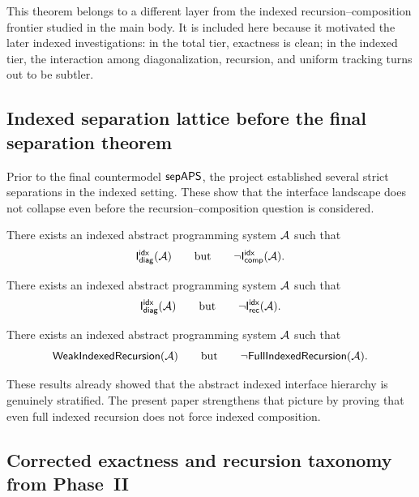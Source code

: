 \documentclass[11pt]{article}
\begin{document}
\begin{remark}
This theorem belongs to a different layer from the indexed recursion--composition frontier studied in the main body.  It is included here because it motivated the later indexed investigations: in the total tier, exactness is clean; in the indexed tier, the interaction among diagonalization, recursion, and uniform tracking turns out to be subtler.
\end{remark}

\subsection{Indexed separation lattice before the final separation theorem}\label{app:indexed-lattice}

Prior to the final countermodel \(\mathsf{sepAPS}\), the project established several strict separations in the indexed setting.  These show that the interface landscape does not collapse even before the recursion--composition question is considered.

\begin{theorem}\label{thm:app-diag-not-comp}
There exists an indexed abstract programming system \(\mathcal{A}\) such that
\[
\mathsf{I}_{\mathsf{diag}}^{\mathsf{idx}}(\mathcal{A})
\qquad\text{but}\qquad
\neg \mathsf{I}_{\mathsf{comp}}^{\mathsf{idx}}(\mathcal{A}).
\]
\end{theorem}

\begin{theorem}\label{thm:app-diag-not-rec}
There exists an indexed abstract programming system \(\mathcal{A}\) such that
\[
\mathsf{I}_{\mathsf{diag}}^{\mathsf{idx}}(\mathcal{A})
\qquad\text{but}\qquad
\neg \mathsf{I}_{\mathsf{rec}}^{\mathsf{idx}}(\mathcal{A}).
\]
\end{theorem}

\begin{theorem}\label{thm:app-weak-not-full}
There exists an indexed abstract programming system \(\mathcal{A}\) such that
\[
\mathsf{WeakIndexedRecursion}(\mathcal{A})
\qquad\text{but}\qquad
\neg \mathsf{FullIndexedRecursion}(\mathcal{A}).
\]
\end{theorem}

These results already showed that the abstract indexed interface hierarchy is genuinely stratified.  The present paper strengthens that picture by proving that even full indexed recursion does not force indexed composition.

\subsection{Corrected exactness and recursion taxonomy from Phase~II}\label{app:phase2}
\end{document}
